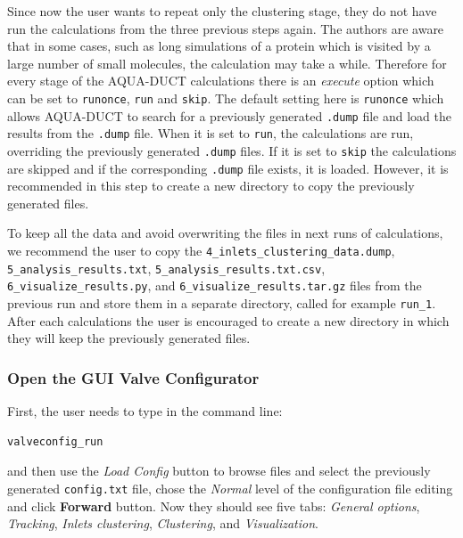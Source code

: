 \documentclass[9pt,tutorial]{livecoms}
\begin{document}
Since now the user wants to repeat only the clustering stage, they do not have run the calculations from the three previous steps again. The authors are aware that in some cases, such as long simulations of a protein which is visited by a large number of small molecules, the calculation may take a while. Therefore for every stage of the AQUA-DUCT calculations there is an \textit{execute} option which can be set to \texttt{runonce}, \texttt{run} and \texttt{skip}. The default setting here is \texttt{runonce} which allows AQUA-DUCT to search for a previously generated \texttt{.dump} file and load the results from the \texttt{.dump} file. When it is set to \texttt{run}, the calculations are run, overriding the previously generated \texttt{.dump} files. If it is set to \texttt{skip} the calculations are skipped and if the corresponding \texttt{.dump} file exists, it is loaded. However, it is recommended in this step to create a new directory to copy the previously generated files.

To keep all the data and avoid overwriting the files in next runs of calculations, we recommend the user to copy the \texttt{4\_inlets\_clustering\_data.dump}, \texttt{5\_analysis\_results.txt}, \texttt{5\_analysis\_results.txt.csv}, \texttt{6\_visualize\_results.py}, and \texttt{6\_visualize\_results.tar.gz} files from the previous run and store them in a separate directory, called for example \texttt{run\_1}. After each calculations the user is encouraged to create a new directory in which they will keep the previously generated files.

\subsubsection{Open the GUI Valve Configurator}
First, the user needs to type in the command line:
\begin{lstlisting}
valveconfig_run
\end{lstlisting}
and then use the \textit{Load Config} button to browse files and select the previously generated \texttt{config.txt} file, chose the \textit{Normal} level of the configuration file editing and click \textbf{Forward} button. Now they should see five tabs: \textit{General options}, \textit{Tracking}, \textit{Inlets clustering}, \textit{Clustering}, and \textit{Visualization}.
\end{document}
